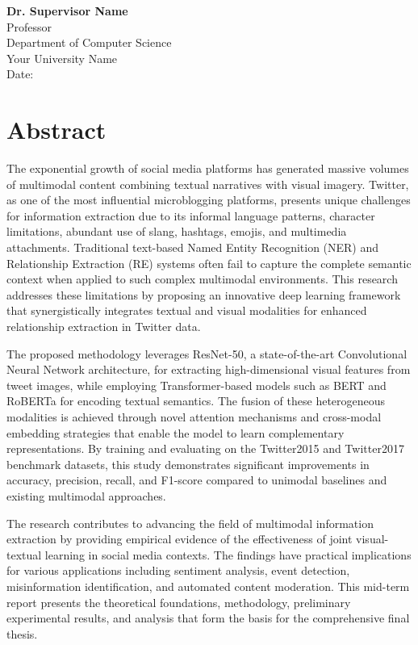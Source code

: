 \documentclass[12pt,a4paper]{report}
\begin{document}
\vspace{2cm}

\noindent
\textbf{Dr. Supervisor Name}\\
Professor\\
Department of Computer Science\\
Your University Name\\
Date: \underline{\hspace{3cm}}

\cleardoublepage

\chapter*{Abstract}
\thispagestyle{empty}

The exponential growth of social media platforms has generated massive volumes of multimodal content combining textual narratives with visual imagery. Twitter, as one of the most influential microblogging platforms, presents unique challenges for information extraction due to its informal language patterns, character limitations, abundant use of slang, hashtags, emojis, and multimedia attachments. Traditional text-based Named Entity Recognition (NER) and Relationship Extraction (RE) systems often fail to capture the complete semantic context when applied to such complex multimodal environments. This research addresses these limitations by proposing an innovative deep learning framework that synergistically integrates textual and visual modalities for enhanced relationship extraction in Twitter data.

The proposed methodology leverages ResNet-50, a state-of-the-art Convolutional Neural Network architecture, for extracting high-dimensional visual features from tweet images, while employing Transformer-based models such as BERT and RoBERTa for encoding textual semantics. The fusion of these heterogeneous modalities is achieved through novel attention mechanisms and cross-modal embedding strategies that enable the model to learn complementary representations. By training and evaluating on the Twitter2015 and Twitter2017 benchmark datasets, this study demonstrates significant improvements in accuracy, precision, recall, and F1-score compared to unimodal baselines and existing multimodal approaches.

The research contributes to advancing the field of multimodal information extraction by providing empirical evidence of the effectiveness of joint visual-textual learning in social media contexts. The findings have practical implications for various applications including sentiment analysis, event detection, misinformation identification, and automated content moderation. This mid-term report presents the theoretical foundations, methodology, preliminary experimental results, and analysis that form the basis for the comprehensive final thesis.
\end{document}
